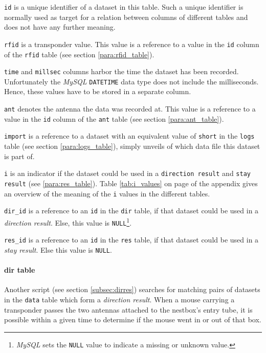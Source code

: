 \begin{mydesc}
  \item \lstinline|id| is a unique identifier of a dataset in this table. Such a unique identifier is normally used as target for a relation between columns of different tables and does not have any further meaning.
  \item \lstinline|rfid| is a transponder value. This value is a reference to a value in the \lstinline|id| column of the \lstinline|rfid| table (see section \ref{para:rfid_table}).
  \item \lstinline|time| and \lstinline|millsec| columns harbor the time the dataset has been recorded. Unfortunately the \textit{MySQL} \lstinline|DATETIME| data type does not include the milliseconds. Hence, these values have to be stored in a separate column.
  \item \lstinline|ant| denotes the antenna the data was recorded at. This value is a reference to a value in the \lstinline|id| column of the \lstinline|ant| table (see section \ref{para:ant_table}).
  \item \lstinline|import| is a reference to a dataset with an equivalent value of \lstinline|short| in the \lstinline|logs| table (see section \ref{para:logs_table}), simply unveils of which data file this dataset is part of.
  \item \lstinline|i| is an indicator if the dataset could be used in a \lstinline|direction result| and \lstinline|stay result| (see \ref{para:res_table}). Table \ref{tab:i_values} on page \pageref{tab:i_values} of the appendix gives an overview of the meaning of the \lstinline|i| values in the different tables.
  \item \lstinline|dir_id| is a reference to an \lstinline|id| in the \lstinline|dir| table, if that dataset could be used in a \textit{direction result}. Else, this value is \lstinline|NULL|\footnote{\textit{MySQL} sets the \lstinline|NULL| value to indicate a missing or unknown value.}.
  \item \lstinline|res_id| is a reference to an \lstinline|id| in the \lstinline|res| table, if that dataset could be used in a \textit{stay result}. Else this value is \lstinline|NULL|.
\end{mydesc}

\paragraph{dir table}
\label{para:dir_table}

Another script (see section \ref{subsec:dirres}) searches for matching pairs of datasets in the \lstinline|data| table which form a \textit{direction result}. When a mouse carrying a transponder passes the two antennas attached to the nestbox's entry tube, it is possible within a given time to determine if the mouse went in or out of that box. 

